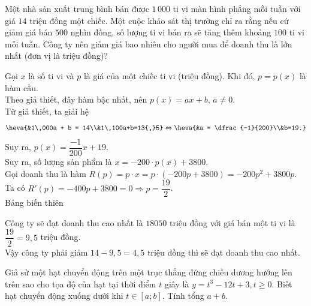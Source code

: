 \begin{ex}%
	Một nhà sản xuất trung bình bán được $1\,000$ ti vi màn hình phẳng mỗi tuần với giá $14$ triệu đồng một chiếc. Một cuộc khảo sát thị trường chỉ ra rằng nếu cứ giảm giá bán $500$ nghìn đồng, số lượng ti vi bán ra sẽ tăng thêm khoảng $100$ ti vi mỗi tuần. Công ty nên giảm giá bao nhiêu cho người mua để doanh thu là lớn nhất (đơn vị là triệu đồng)?
	
	\loigiai
	{
		Gọi $x$ là số ti vi và $p$ là giá của một chiếc ti vi (triệu đồng). Khi đó, $p=p(x)$ là hàm cầu.\\
		Theo giả thiết, đây hàm bậc nhất, nên $p(x) = ax + b$, $a \ne 0$.\\
		Từ giả thiết, ta giải hệ
		$$\heva{&1\,000a + b = 14\\&1\,100a+b=13{,}5} \Leftrightarrow \heva{&a = \dfrac{-1}{200}\\&b=19.}$$
		Suy ra, $p(x) = \dfrac{-1}{200}x + 19$.\\
		Suy ra, số lượng sản phẩm là $x = -200\cdot p(x) + 3800$.\\
		Gọi doanh thu là hàm $R(p) = p\cdot x = p\cdot\left(-200p + 3800\right) = -200p^2+3800p$.\\
		Ta có $R'(p) = -400p + 3800 = 0 \Rightarrow p = \dfrac{19}{2}$.\\
		Bảng biến thiên
		\begin{center}
			\begin{center}
			\end{center}
		\end{center}
		Công ty sẽ đạt doanh thu cao nhất là $18050$ triệu đồng với giá bán một ti vi là $\dfrac{19}{2} = 9{,}5$ triệu đồng.\\
		Vậy công ty phải giảm $14-9{,}5 = 4{,}5$ triệu đồng thì sẽ đạt doanh thu cao nhất.
	}
\end{ex}

\begin{ex}%
	 Giả sử một hạt chuyển động trên một trục thẳng đứng chiều dương hướng lên trên sao cho tọa độ của hạt tại thời điểm $ t $ giây là $ y=t^3-12t+3, t\ge 0 $. Biết hạt chuyển động xuống dưới khi $ t\in \left[a;b\right] $. Tính tổng $ a+b $.
	 
\end{ex}

